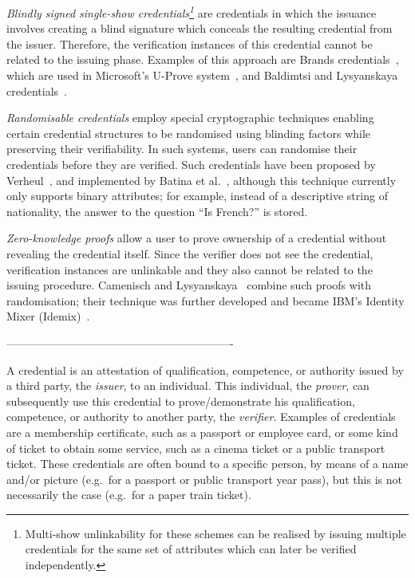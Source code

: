 \label{unlinkApproaches}
\emph{Blindly signed single-show credentials\footnote{Multi-show unlinkability
for these schemes can be realised by issuing multiple credentials for the same
set of attributes which can later be verified independently.}} are credentials
in which the issuance involves creating a blind signature which conceals the
resulting credential from the issuer. Therefore, the verification instances of
this credential cannot be related to the issuing phase. Examples of this
approach are Brands credentials~\cite{Brands2000}, which are used in
Microsoft's U-Prove system~\cite{U-Prove_Crypto2011}, and Baldimtsi and
Lysyanskaya credentials~\cite{BaLy2012}.

\emph{Randomisable credentials} employ special cryptographic techniques
enabling certain credential structures to be randomised using blinding factors
while preserving their verifiability. In such systems, users can randomise their
credentials before they are verified. Such credentials have been proposed by
Verheul~\cite{Verheul01}, and implemented by Batina et
al.~\cite{BatinaHJMV10}, although this technique currently only supports binary
attributes; for example, instead of a descriptive string of nationality, the
answer to the question ``Is French?'' is stored.

\emph{Zero-knowledge proofs} allow a user to prove ownership of a credential
without revealing the credential itself. Since the verifier does not see the
credential, verification instances are unlinkable and they also cannot be
related to the issuing procedure. Camenisch and
Lysyanskaya~\cite{CL2001,CL2003} combine such proofs with randomisation; their
technique was further developed and became IBM's Identity Mixer
(Idemix)~\cite{idemix_spec_2.3.4}.


-------------------------------------------------------------

A credential is an attestation of qualification, competence, or authority
issued by a third party, the \emph{issuer}, to an individual. This
individual, the \emph{prover}, can subsequently use this credential to
prove\slash demonstrate his qualification, competence, or authority to
another party, the \emph{verifier}. Examples of credentials are a
membership certificate, such as a passport or employee card, or some kind
of ticket to obtain some service, such as a cinema ticket or a public
transport ticket. These credentials are often bound to a specific person,
by means of a name and\slash or picture (e.g.\ for a passport or public
transport year pass), but this is not necessarily the case (e.g.\ for a
paper train ticket).

